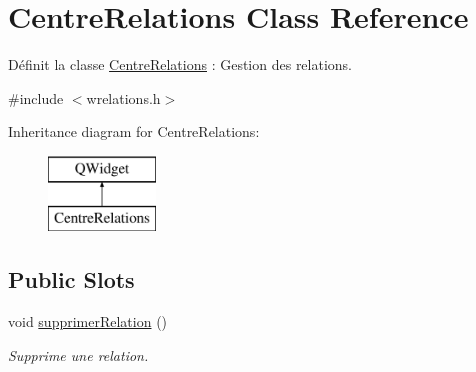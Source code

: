 \hypertarget{class_centre_relations}{}\section{Centre\+Relations Class Reference}
\label{class_centre_relations}


Définit la classe \hyperlink{class_centre_relations}{Centre\+Relations} \+: Gestion des relations.  




{\ttfamily \#include $<$wrelations.\+h$>$}

Inheritance diagram for Centre\+Relations\+:\begin{figure}[H]
\begin{center}
\leavevmode
\includegraphics[height=2.000000cm]{class_centre_relations}
\end{center}
\end{figure}
\subsection*{Public Slots}
\begin{DoxyCompactItemize}
\item 
\mbox{\label{class_centre_relations_ac8503826979abeaea33b2284196dd3a0}} 
void \hyperlink{class_centre_relations_ac8503826979abeaea33b2284196dd3a0}{supprimer\+Relation} ()
\begin{DoxyCompactList}\small\item\em Supprime une relation. \end{DoxyCompactList}\end{DoxyCompactItemize}
